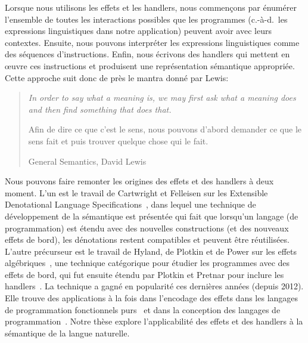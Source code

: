 Lorsque nous utilisons les effets et les handlers, nous commençons par énumérer
l'ensemble de toutes les interactions possibles que les programmes (c.-à-d.\ les
expressions linguistiques dans notre application) peuvent avoir avec leurs
contextes. Ensuite, nous pouvons interpréter les expressions linguistiques comme
des séquences d'instructions. Enfin, nous écrivons des handlers qui
mettent en œuvre ces instructions et produisent une représentation sémantique
appropriée. Cette approche suit donc de près le mantra donné par Lewis:

\begin{quote}
  \begin{english}
    \textit{In order to say what a meaning is, we may first ask what a meaning
      does and then find something that does that.}
  \end{english}

  Afin de dire ce que c'est le sens, nous pouvons d'abord demander ce que le
  sens fait et puis trouver quelque chose qui le fait.

  \begin{flushright}
    General Semantics, David Lewis~\cite{lewis1970general}
  \end{flushright}
\end{quote}

Nous pouvons faire remonter les origines des effets et des handlers à deux moment. L'un
est le travail de Cartwright et Felleisen sur les Extensible Denotational
Language Specifications~\cite{cartwright1994extensible}, dans lequel une
technique de développement de la sémantique est présentée qui fait que lorsqu'un
langage (de programmation) est étendu avec des nouvelles constructions (et des
nouveaux effets de bord), les dénotations restent compatibles et peuvent être
réutilisées. L'autre précurseur est le travail de Hyland, de Plotkin et de Power
sur les effets algébriques~\cite{hyland2006combining}, une technique catégorique
pour étudier les programmes avec des effets de bord, qui fut ensuite étendu par
Plotkin et Pretnar pour inclure les
handlers~\cite{plotkin2009handlers,pretnar2010logic,plotkin2013handling}. La
technique a gagné en popularité ces dernières années (depuis 2012). Elle
trouve des applications à la fois dans l'encodage des effets dans les langages
de programmation fonctionnels
purs~\cite{kiselyov2013extensible,kiselyov2015freer,kammar2013handlers,brady2013programming}
et dans la conception des langages de
programmation~\cite{bauer2012programming,lindley2016dobedobedo,dolan2015effective,kiselyov2016eff,hillerstrom2016compiling}.
Notre thèse explore l'applicabilité des effets et des handlers à la sémantique
de la langue naturelle.

